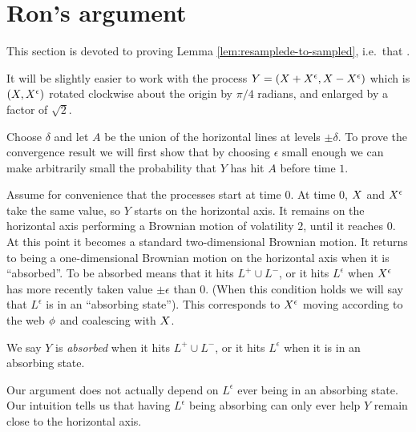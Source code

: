{
\section{Ron's argument}

\newcommand{\bandwidth}{\delta}
\newcommand{\rotproc}{Y}

\newcommand{\union}{\cup}
\renewcommand{\L}{L^+ \union L^-}
\newcommand{\Le}{L^\epsilon}

This section is devoted to proving Lemma
\ref{lem:resamplede-to-sampled}, i.e.\ that
\statementoflemresampledetosampled.

It will be slightly easier to work with the process $\rotproc =
(\sampled + \resamplede, \sampled - \resamplede)$ which is $(X,
X^{\epsilon})$ rotated clockwise about the origin by $\pi / 4$ radians, and enlarged by a factor of
$\sqrt{2}$.

\newcommand{\boundarylines}{A}

Choose $\delta$ and let $\boundarylines$ be the union of the
horizontal lines at levels $\pm\delta$.  To prove the convergence
result we will first show that by choosing $\epsilon$ small enough we
can make arbitrarily small the probability that $\rotproc$ has hit
$\boundarylines$ before time $1$.

Assume for convenience that the processes start at time $0$.  At time
$0$, $X$ and $X^{\epsilon}$ take the same value, so $\rotproc$
starts on the horizontal axis.  It remains on the horizontal axis
performing a Brownian motion of volatility $2$, until it reaches $0$.
At this point it becomes a standard two-dimensional Brownian motion.
It returns to being a one-dimensional Brownian motion on the
horizontal axis when it is ``absorbed''.  To be absorbed means that it
hits $\L$, or it hits $\Le$ when $X^{\epsilon}$ has more recently taken
value $\pm\epsilon$ than $0$.  (When this condition holds we will say
that $\Le$ is in an ``absorbing state'').  This corresponds to
$X^{\epsilon}$ moving according to the web $\phi$ and coalescing
with $X$.

\begin{definition}
  We say $Y$ is \emph{absorbed} when it hits $\L$, or it hits $\Le$
  when it is in an absorbing state.
\end{definition}

Our argument does not actually depend on $\Le$ ever being in an
absorbing state.  Our intuition tells us that having $\Le$ being
absorbing can only ever help $\rotproc$ remain close to the horizontal
axis.

}
